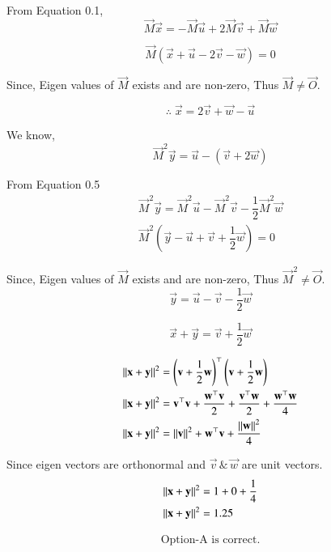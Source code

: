 \documentclass[journal]{IEEEtran}
\begin{document}
From Equation 0.1,
\begin{equation}
    \vec{M}\vec{x} = -\vec{M}\vec{u} + 2\vec{M}\vec{v} + \vec{M}\vec{w}
\end{equation}

\begin{equation}
    \vec{M}(\vec{x} + \vec{u} - 2\vec{v} - \vec{w}) = 0
\end{equation}

Since, Eigen values of $\vec{M}$ exists and are non-zero, Thus $\vec{M} \neq \vec{O}$.

\begin{equation}
    \therefore \; \vec{x} = 2\vec{v} + \vec{w} -\vec{u}
\end{equation}

We know,
\begin{equation}
\vec{M}^2\vec{y} = \vec{u} - (\vec{v} + 2\vec{w})
\end{equation} 

From Equation 0.5
\begin{align}
    \vec{M}^2\vec{y} = \vec{M}^2\vec{u} - \vec{M}^2\vec{v} - \dfrac{1}{2}\vec{M}^2\vec{w} \\
\vec{M}^2(\vec{y} - \vec{u} + \vec{v} + \dfrac{1}{2}\vec{w}) = 0
\end{align}

Since, Eigen values of $\vec{M}$ exists and are non-zero, Thus $\vec{M}^2 \neq \vec{O}$.
\begin{equation}
    \vec{y} = \vec{u} - \vec{v} - \dfrac{1}{2}\vec{w}
\end{equation}

\begin{equation}
    \vec{x} + \vec{y} = \vec{v} + \dfrac{1}{2}\vec{w}
\end{equation}

\begin{align}
    \left\lVert\mathbf{x} + \mathbf{y}\right\rVert^2 &= \left(\mathbf{v} + \frac{1}{2}\mathbf{w}\right)^\top\left(\mathbf{v} + \frac{1}{2}\mathbf{w}\right) \\
     \left\lVert\mathbf{x} + \mathbf{y}\right\rVert^2 &= \mathbf{v}^\top\mathbf{v} + \frac{\mathbf{w}^\top\mathbf{v}}{2} + \dfrac{\mathbf{v}^\top\mathbf{w}}{2} + \dfrac{\mathbf{w}^\top\mathbf{w}}{4} \\
\left\lVert\mathbf{x}+\mathbf{y}\right\rVert^2 &= \left\lVert\mathbf{v}\right\rVert^2 + \mathbf{w}^\top\mathbf{v} + \dfrac{\left\lVert\mathbf{w}\right\rVert^2}{4}
\end{align}

Since eigen vectors are orthonormal and $\vec{v} \, \& \, \vec{w}$ are unit vectors.
\begin{align}
\left\lVert\mathbf{x} + \mathbf{y}\right\rVert^2 &= 1 + 0 + \dfrac{1}{4} \\
    \left\lVert\mathbf{x} + \mathbf{y}\right\rVert^2 &= 1.25
\end{align}

\begin{align*}
    \boxed{\text{Option-A is correct.}}
\end{align*}
\end{document}
